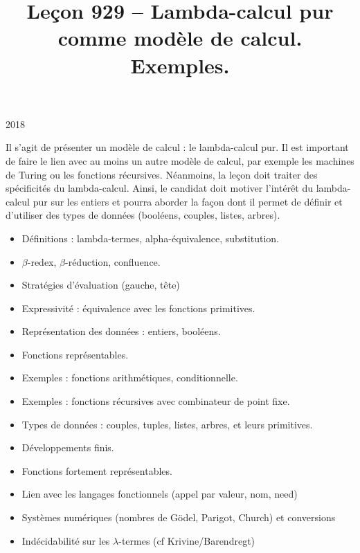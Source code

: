 \documentclass{agregfiche}
\title{Leçon 929 -- Lambda-calcul pur comme modèle de calcul. Exemples.}
\begin{document}
\maketitle

\secrapports

\begin{rapport}{2018}

Il s'agit de présenter un modèle de calcul : le lambda-calcul pur.
Il est important de faire le lien avec au moins un autre modèle de calcul, par exemple les machines de Turing ou les fonctions récursives.
Néanmoins, la leçon doit traiter des spécificités du lambda-calcul.
Ainsi, le candidat doit motiver l'intérêt du lambda-calcul pur sur les entiers et pourra aborder la façon dont il permet de définir et d'utiliser des types de données (booléens, couples, listes, arbres).

\end{rapport}

\secindispensables

\begin{itemize}
    \item Définitions : lambda-termes, alpha-équivalence, substitution.
    \item $\beta$-redex, $\beta$-réduction, confluence.
   	\item Stratégies d'évaluation (gauche, tête)
   	\item Expressivité : équivalence avec les fonctions primitives.
\end{itemize}

\secasavoir

\begin{itemize}
	\item Représentation des données : entiers, booléens.
	\item Fonctions représentables.
	\item Exemples : fonctions arithmétiques, conditionnelle.
	\item Exemples : fonctions récursives avec combinateur de point 
	fixe.
\end{itemize}

\secidees

\begin{itemize}
	\item Types de données : couples, tuples, listes, arbres, et leurs primitives.
	\item Développements finis.
	\item Fonctions fortement représentables.
	\item Lien avec les langages fonctionnels (appel par valeur, nom, need)
	\item Systèmes numériques (nombres de Gödel, Parigot, Church) et conversions
	\item Indécidabilité sur les $\lambda$-termes (cf Krivine/Barendregt)
\end{itemize}
\end{document}
